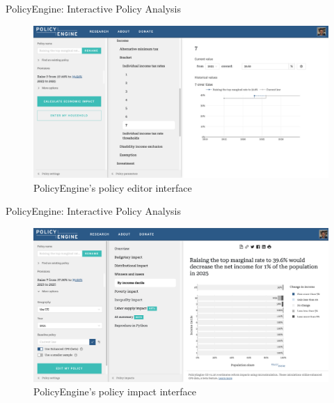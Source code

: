 \documentclass{beamer}
\begin{document}
\begin{frame}{PolicyEngine: Interactive Policy Analysis}
    \begin{figure}
        \centering
        \includegraphics[width=\textwidth]{../../paper/figures/policyengine_policy.png}
        \caption{PolicyEngine's policy editor interface}
    \end{figure}
\end{frame}

\begin{frame}{PolicyEngine: Interactive Policy Analysis}
    \begin{figure}
        \centering
        \includegraphics[width=\textwidth]{../../paper/figures/policyengine_results.png}
        \caption{PolicyEngine's policy impact interface}
    \end{figure}
\end{frame}
\end{document}
